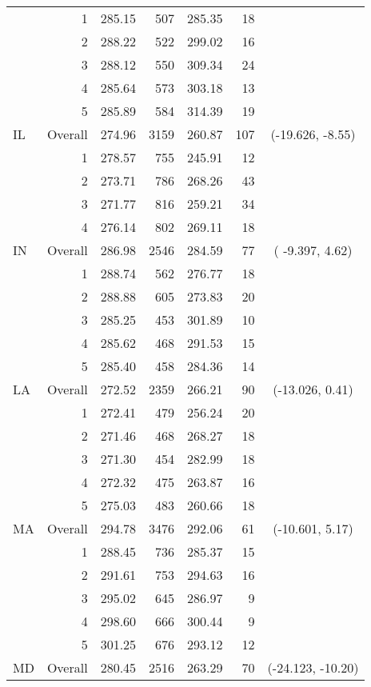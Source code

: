 \begin{longtable}{lrrr@{\extracolsep{.25cm}}rrc}
   & 1 & 285.15 & 507 & 285.35 &  18 &  \\ 
   & 2 & 288.22 & 522 & 299.02 &  16 &  \\ 
   & 3 & 288.12 & 550 & 309.34 &  24 &  \\ 
   & 4 & 285.64 & 573 & 303.18 &  13 &  \\ 
   & 5 & 285.89 & 584 & 314.39 &  19 &  \\ 
   \hline
IL & Overall & 274.96 & 3159 & 260.87 & 107 & (-19.626,  -8.55) \\ 
   & 1 & 278.57 & 755 & 245.91 &  12 &  \\ 
   & 2 & 273.71 & 786 & 268.26 &  43 &  \\ 
   & 3 & 271.77 & 816 & 259.21 &  34 &  \\ 
   & 4 & 276.14 & 802 & 269.11 &  18 &  \\ 
   \hline
IN & Overall & 286.98 & 2546 & 284.59 &  77 & ( -9.397,   4.62) \\ 
   & 1 & 288.74 & 562 & 276.77 &  18 &  \\ 
   & 2 & 288.88 & 605 & 273.83 &  20 &  \\ 
   & 3 & 285.25 & 453 & 301.89 &  10 &  \\ 
   & 4 & 285.62 & 468 & 291.53 &  15 &  \\ 
   & 5 & 285.40 & 458 & 284.36 &  14 &  \\ 
   \hline
LA & Overall & 272.52 & 2359 & 266.21 &  90 & (-13.026,   0.41) \\ 
   & 1 & 272.41 & 479 & 256.24 &  20 &  \\ 
   & 2 & 271.46 & 468 & 268.27 &  18 &  \\ 
   & 3 & 271.30 & 454 & 282.99 &  18 &  \\ 
   & 4 & 272.32 & 475 & 263.87 &  16 &  \\ 
   & 5 & 275.03 & 483 & 260.66 &  18 &  \\ 
   \hline
MA & Overall & 294.78 & 3476 & 292.06 &  61 & (-10.601,   5.17) \\ 
   & 1 & 288.45 & 736 & 285.37 &  15 &  \\ 
   & 2 & 291.61 & 753 & 294.63 &  16 &  \\ 
   & 3 & 295.02 & 645 & 286.97 &   9 &  \\ 
   & 4 & 298.60 & 666 & 300.44 &   9 &  \\ 
   & 5 & 301.25 & 676 & 293.12 &  12 &  \\ 
   \hline
MD & Overall & 280.45 & 2516 & 263.29 &  70 & (-24.123, -10.20) \\ 

\end{longtable}
